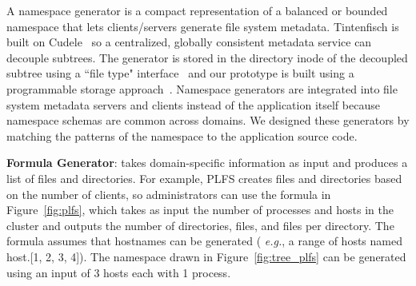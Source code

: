 A namespace generator is a compact representation of a balanced or
bounded namespace that lets clients/servers generate file system
metadata.  Tintenfisch is built on Cudele~\cite{sevilla:ipdps18-cudele}
so a centralized, globally consistent metadata service can decouple
subtrees.  The generator is stored in the directory inode of the
decoupled subtree using a ``file type"
interface~\cite{watkins_datamods_2012} and our prototype is built using
a programmable storage approach~\cite{sevilla:eurosys17-malacology,
oldfield:cc06-lwfs}.  Namespace generators are integrated into file
system metadata servers and clients instead of the application itself
because namespace schemas are common across domains.  We designed these
generators by matching the patterns of the namespace to the application
source code. 



\textbf{Formula Generator}: takes domain-specific information as input and
produces a list of files and directories.  For example, PLFS creates files and
directories based on the number of clients, so administrators can use the
formula in Figure~\ref{fig:plfs}, which takes as input the number of processes
and hosts in the cluster and outputs the number of directories, files, and
files per directory.  The formula assumes that hostnames can be generated ({\it
e.g.}, a range of hosts named host.[1, 2, 3, 4]). The namespace drawn in
Figure~\ref{fig:tree_plfs} can be generated using an input of 3 hosts each with
1 process.



